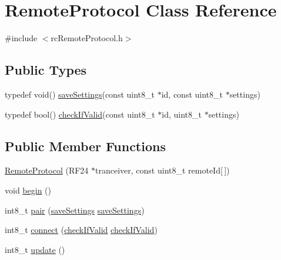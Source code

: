 \hypertarget{classRemoteProtocol}{}\section{Remote\+Protocol Class Reference}
\label{classRemoteProtocol}


{\ttfamily \#include $<$rc\+Remote\+Protocol.\+h$>$}

\subsection*{Public Types}
\begin{DoxyCompactItemize}
\item 
typedef void() \hyperlink{classRemoteProtocol_ab9e87c74f439c0cadd0823afb1509d55}{save\+Settings}(const uint8\+\_\+t $\ast$id, const uint8\+\_\+t $\ast$settings)
\item 
typedef bool() \hyperlink{classRemoteProtocol_a6c79a9aff87a0ef816d49e1eda9a639e}{check\+If\+Valid}(const uint8\+\_\+t $\ast$id, uint8\+\_\+t $\ast$settings)
\end{DoxyCompactItemize}
\subsection*{Public Member Functions}
\begin{DoxyCompactItemize}
\item 
\hyperlink{classRemoteProtocol_ac372a2187a4cdb43443834ad104b92e6}{Remote\+Protocol} (R\+F24 $\ast$tranceiver, const uint8\+\_\+t remote\+Id\mbox{[}$\,$\mbox{]})
\item 
void \hyperlink{classRemoteProtocol_ac59aca8e8ce184ea9b46187e92708027}{begin} ()
\item 
int8\+\_\+t \hyperlink{classRemoteProtocol_ac35879305b9a753c2b630979e4fb4aee}{pair} (\hyperlink{classRemoteProtocol_ab9e87c74f439c0cadd0823afb1509d55}{save\+Settings} \hyperlink{classRemoteProtocol_ab9e87c74f439c0cadd0823afb1509d55}{save\+Settings})
\item 
int8\+\_\+t \hyperlink{classRemoteProtocol_a0948e420ac812906e683fb47041287b8}{connect} (\hyperlink{classRemoteProtocol_a6c79a9aff87a0ef816d49e1eda9a639e}{check\+If\+Valid} \hyperlink{classRemoteProtocol_a6c79a9aff87a0ef816d49e1eda9a639e}{check\+If\+Valid})
\item 
int8\+\_\+t \hyperlink{classRemoteProtocol_ad837e6469d792f906551293ce0a9ad71}{update} ()
\end{DoxyCompactItemize}


